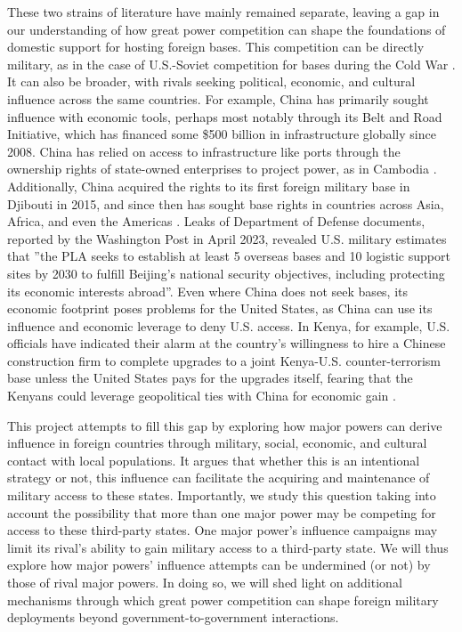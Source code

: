 These two strains of literature have mainly remained separate, leaving a gap in our understanding of how great power competition can shape the foundations of domestic support for hosting foreign bases. This competition can be directly military, as in the case of U.S.-Soviet competition for bases during the Cold War \cite{Nieman2020,Harkavy1982}. It can also be broader, with rivals seeking political, economic, and cultural influence across the same countries. For example, China has primarily sought influence with economic tools, perhaps most notably through its Belt and Road Initiative, which has financed some \$500 billion in infrastructure globally since 2008. China has relied on access to infrastructure like ports through the ownership rights of state-owned enterprises to project power, as in Cambodia \cite{kardon2022,kardon2022pier}. Additionally, China acquired the rights to its first foreign military base in Djibouti in 2015, and since then has sought base rights in countries across Asia, Africa, and even the Americas \cite{hudson2023,strobel2023}. Leaks of Department of Defense documents, reported by the Washington Post in April 2023, revealed U.S. military estimates that ''the PLA seeks to establish at least 5 overseas bases and 10 logistic support sites by 2030 to fulfill Beijing's national security objectives, including protecting its economic interests abroad''\cite{hudson2023}. Even where China does not seek bases, its economic footprint poses problems for the United States, as China can use its influence and economic leverage to deny U.S. access. In Kenya, for example, U.S. officials have indicated their alarm at the country's willingness to hire a Chinese construction firm to complete upgrades to a joint Kenya-U.S. counter-terrorism base unless the United States pays for the upgrades itself, fearing that the Kenyans could leverage geopolitical ties with China for economic gain \cite{philips2023}.

This project attempts to fill this gap by exploring how major powers can derive influence in foreign countries through military, social, economic, and cultural contact with local populations. It argues that whether this is an intentional strategy or not, this influence can facilitate the acquiring and maintenance of military access to these states. Importantly, we study this question taking into account the possibility that more than one major power may be competing for access to these third-party states. One major power's influence campaigns may limit its rival's ability to gain military access to a third-party state. We will thus explore how major powers' influence attempts can be undermined (or not) by those of rival major powers. In doing so, we will shed light on additional mechanisms through which great power competition can shape foreign military deployments beyond government-to-government interactions. 

